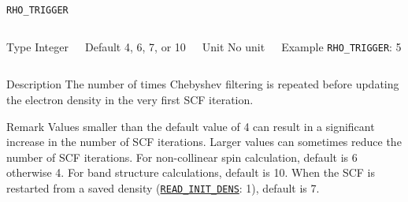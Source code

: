\begin{frame}[allowframebreaks]{\texttt{RHO\_TRIGGER}} \label{RHO_TRIGGER}
\vspace*{-12pt}
\begin{columns}
\begin{block}{Type}
Integer
\end{block}

\begin{block}{Default}
4, 6, 7, or 10
\end{block}

\begin{block}{Unit}
No unit
\end{block}

\begin{block}{Example}
\texttt{RHO\_TRIGGER}: 5
\end{block}
\end{columns}

\begin{block}{Description}
The number of times Chebyshev filtering is repeated before updating the electron density in the very first SCF iteration.
\end{block}

\begin{block}{Remark}
Values smaller than the default value of 4 can result in a significant increase in the number of SCF
iterations. Larger values can sometimes reduce the number of SCF iterations. For non-collinear spin calculation, default is 6 otherwise 4. For band structure calculations, default is 10. When the SCF is restarted from a saved density (\hyperlink{READ_INIT_DENS}{\texttt{READ\_INIT\_DENS}}: 1), default is 7.
\end{block}

\end{frame}



